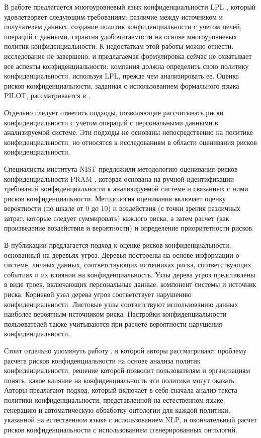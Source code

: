 \documentclass[../main]{subfiles}
\begin{document}
В работе \cite{MDPI15} предлагается многоуровневый язык конфиденциальности LPL \cite{MDPI15}, который удовлетворяет следующим требованиям: различие между источником и получателем данных, создание политик конфиденциальности с учетом целей, операций с данными, гарантия удобочитаемости на основе многоуровневых политик конфиденциальности. К недостаткам этой работы можно отнести: исследование не завершено, и предлагаемая формулировка сейчас не охватывает все аспекты конфиденциальности; компания должна определить свою политику конфиденциальности, используя LPL, прежде чем анализировать ее. Оценка рисков конфиденциальности, заданная с использованием формального языка PILOT, рассматривается в \cite{MDPI14}.

Отдельно следует отметить подходы, позволяющие рассчитывать риски конфиденциальности с учетом операций с персональными данными в анализируемой системе. Эти подходы не основаны непосредственно на политике конфиденциальности, но относятся к исследованиям в области оценивания рисков конфиденциальности.

Специалисты института NIST предложили методологию оценивания рисков конфиденциальности PRAM \cite{MDPI16}, которая основана на ручной идентификации требований конфиденциальности к анализируемой системе и связанных с ними рисков конфиденциальности. Методология оценивания включает оценку вероятности (по шкале от 0 до 10) и воздействия (с точки зрения различных затрат, которые следует суммировать) каждого риска, а затем расчет (как произведение воздействия и вероятности) и определение приоритетности рисков.

В публикации \cite{MDPI17} предлагается подход к оценке рисков конфиденциальности, основанный на деревьях угроз. Деревья построены на основе информации о системе, личных данных, соответствующих источниках риска, соответствующих событиях и их влиянии на конфиденциальность. Узлы дерева угроз представлены в виде троек, включающих персональные данные, компонент системы и источник риска. Корневой узел дерева угроз соответствует нарушению конфиденциальности. Листовые узлы соответствуют использованию данных наиболее вероятным источником риска. Настройки конфиденциальности пользователей также учитываются при расчете вероятности нарушения конфиденциальности.

Стоит отдельно упомянуть работу \cite{P2Onto}, в которой авторы рассматривают проблему расчета рисков конфиденциальности на основе анализа политик конфиденциальности, решение которой позволит пользователям и организациям понять, какое влияние на конфиденциальность эти политики могут оказать. Авторы предлагают подход, который включает в себя сначала анализ текста политики конфиденциальности, представленной на естественном языке, генерацию и автоматическую обработку онтологии для каждой политики, указанной на естественном языке с использованием NLP, и окончательный расчет рисков конфиденциальности с использованием сгенерированных онтологий.
\end{document}
